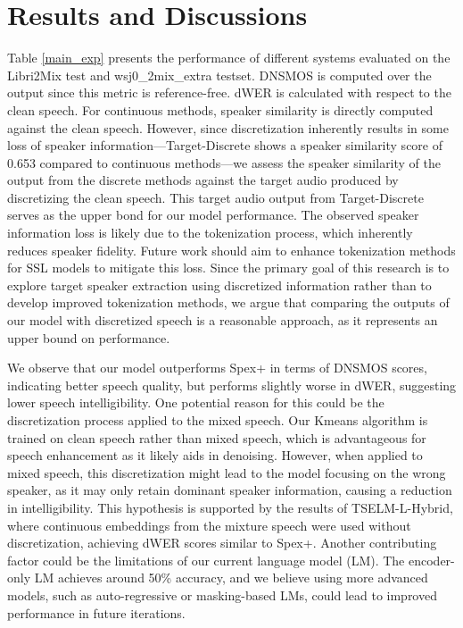 \documentclass[conference]{IEEEtran}
\begin{document}
\section{Results and Discussions}
Table \ref{main_exp} presents the performance of different systems evaluated on the Libri2Mix test and wsj0\_2mix\_extra testset. 
DNSMOS is computed over the 
output since this metric is reference-free. dWER is calculated with respect to the clean speech. 
For continuous methods, speaker similarity is directly computed against the clean speech. 
However, since discretization inherently results in some loss of speaker information—Target-Discrete shows a speaker similarity score of 0.653 compared to continuous methods—we assess the speaker similarity of the output from the discrete methods against the target audio produced by discretizing the clean speech. 
This target audio output from Target-Discrete serves as the upper bond for our model performance.
The observed speaker information loss is likely due to the tokenization process, which inherently reduces speaker fidelity. Future work should aim to enhance tokenization methods for SSL models to mitigate this loss. Since the primary goal of this research is to explore target speaker extraction using discretized information rather than to develop improved tokenization methods, we argue that comparing the outputs of our model with discretized speech is a reasonable approach, as it represents an upper bound on performance.

We observe that our model outperforms Spex+ in terms of DNSMOS scores, indicating better speech quality, but performs slightly worse in dWER, suggesting lower speech intelligibility. One potential reason for this could be the discretization process applied to the mixed speech. Our Kmeans algorithm is trained on clean speech rather than mixed speech, which is advantageous for speech enhancement as it likely aids in denoising. However, when applied to mixed speech, this discretization might lead to the model focusing on the wrong speaker, as it may only retain dominant speaker information, causing a reduction in intelligibility.
This hypothesis is supported by the results of TSELM-L-Hybrid, where continuous embeddings from the mixture speech were used without discretization, achieving dWER scores similar to Spex+. Another contributing factor could be the limitations of our current language model (LM). The encoder-only LM achieves around 50\% accuracy, and we believe using more advanced models, such as auto-regressive or masking-based LMs, could lead to improved performance in future iterations.
\end{document}
